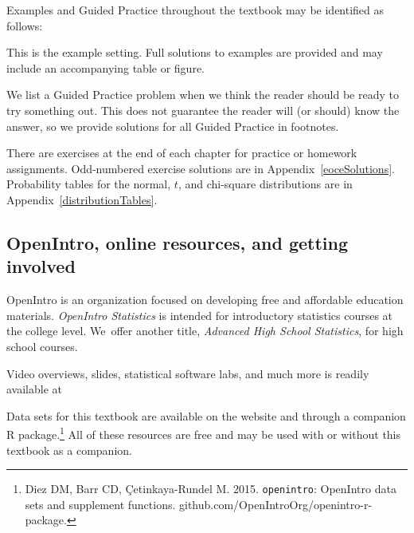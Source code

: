 Examples and Guided Practice throughout the textbook may be
identified as follows:

\begin{examplewrap}
\begin{nexample}{This is the example setting.}
  Full solutions to examples are provided and may include
  an accompanying table or figure.
\end{nexample}
\end{examplewrap}

\begin{exercisewrap}
\begin{nexercise}
We list a Guided Practice problem when we think the reader
should be ready to try something out.
This does not guarantee the reader will (or should)
know the answer, so we provide solutions for all Guided
Practice in footnotes.\footnotemark
\end{nexercise}
\end{exercisewrap}

There are exercises at the end of each chapter for practice
or homework assignments.
Odd-numbered exercise solutions are in
Appendix~\ref{eoceSolutions}.
Probability tables for the normal, $t$,
and chi-square distributions are in
Appendix~\ref{distributionTables}.

\subsection*{OpenIntro, online resources, and getting involved}

OpenIntro is an organization focused on developing
free and affordable education materials.
\emph{OpenIntro Statistics} is intended for introductory
statistics courses at the college level.
We~offer another title,
    {\emph{Advanced High School Statistics}},
for high school courses.

Video overviews, slides, statistical software labs,
and much more is readily available at\\[-2mm]
\begin{center}
\end{center}
Data sets for this textbook are available on the website
and through a companion R package.\footnote{Diez DM,
    Barr CD, \c{C}etinkaya-Rundel M. 2015.
    \texttt{openintro}: OpenIntro data sets and supplement
    functions.
        {github.com/OpenIntroOrg/openintro-r-package}.}
All of these resources are free and may be used with
or without this textbook as a companion.

